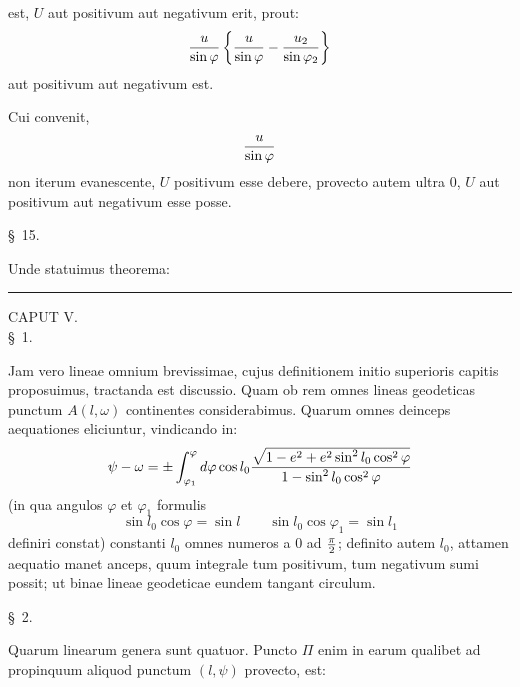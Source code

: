 est, $U$ aut positivum aut negativum erit, prout:
\[
 {u\over \sin\varphi}\left\{{u\over \sin\varphi}-{u_2\over \sin\varphi_2}\right\}
\]
aut positivum aut negativum est.

Cui convenit,
\[
 {u\over \sin\varphi}
\]
non iterum evanescente, $U$ positivum esse debere, provecto autem ultra $0$, $U$ aut positivum aut negativum esse posse.

\begin{center}\S\ 15.\end{center}

Unde statuimus theorema:
\begin{quote}
\end{quote}

\bigskip\hrule\bigskip

\begin{center}
{\large CAPUT V.}\\[0.8em]
\S\ 1.
\end{center}

Jam vero lineae omnium brevissimae, cujus definitionem initio superioris capitis proposuimus, tractanda est discussio. Quam ob rem omnes lineas geodeticas punctum $A(l,\omega)$ continentes considerabimus. Quarum omnes deinceps aequationes eliciuntur, vindicando in:
\[
 \psi-\omega=\pm\int_{\varphi_1}^{\varphi}d\varphi\cos l_0{\sqrt{1-e^2+e^2\sin^2l_0\cos^2\varphi}\over 1-\sin^2l_0\cos^2\varphi}
\]
(in qua angulos $\varphi$ et $\varphi_1$ formulis
\[
 \sin l_0\cos\varphi=\sin l\qquad \sin l_0\cos\varphi_1=\sin l_1
\]
definiri constat) constanti $l_0$ omnes numeros a $0$ ad ${\pi\over2}$; definito autem $l_0$, attamen aequatio manet anceps, quum integrale tum positivum, tum negativum sumi possit; ut binae lineae geodeticae eundem tangant circulum.

\begin{center}\S\ 2.\end{center}

Quarum linearum genera sunt quatuor. Puncto $\Pi$ enim in earum qualibet ad propinquum aliquod punctum $(l,\psi)$ provecto, est:

